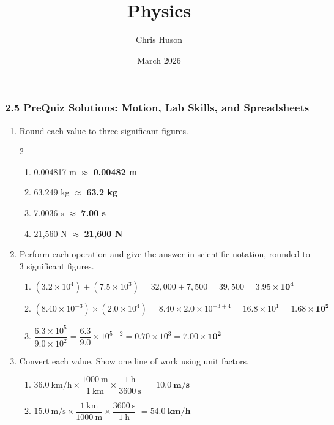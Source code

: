 \documentclass[12pt, twoside]{article}
\title{Physics}
\author{Chris Huson}
\date{March 2026}
\begin{document}
\subsubsection*{2.5 PreQuiz Solutions: Motion, Lab Skills, and Spreadsheets}

\begin{enumerate}[itemsep=0.25cm]

\item Round each value to three significant figures.
  \begin{multicols}{2}
  \begin{enumerate}[itemsep=0.25cm]
    \item 0.004817 m $\approx$ \textbf{0.00482 m}
    \item 63.249 kg $\approx$ \textbf{63.2 kg}
    \item 7.0036 s $\approx$ \textbf{7.00 s}
    \item 21,560 N $\approx$ \textbf{21,600 N}
  \end{enumerate}
  \end{multicols}
  \vspace{0.25cm}

\item Perform each operation and give the answer in scientific notation, rounded to 3 significant figures.
  \begin{enumerate}[itemsep=0.5cm]
    \item $(3.2\times10^{4}) + (7.5\times10^{3}) = 32{,}000 + 7{,}500 = 39{,}500 = \mathbf{3.95\times10^{4}}$
    \item $(8.40\times10^{-3}) \times (2.0\times10^{4}) = 8.40 \times 2.0 \times 10^{-3+4} = 16.8 \times 10^{1} = \mathbf{1.68\times10^{2}}$
    \item $\dfrac{6.3\times10^{5}}{9.0\times10^{2}} = \dfrac{6.3}{9.0}\times10^{5-2} = 0.70\times10^{3} = \mathbf{7.00\times10^{2}}$
  \end{enumerate}
  \vspace{0.25cm}

\item Convert each value. Show one line of work using unit factors.
  \begin{enumerate}[itemsep=0.75cm]
    \item $36.0~\text{km/h} \times \dfrac{1000~\text{m}}{1~\text{km}} \times \dfrac{1~\text{h}}{3600~\text{s}}$ $= \mathbf{10.0~\textbf{m/s}}$
    \item $15.0~\text{m/s} \times \dfrac{1~\text{km}}{1000~\text{m}} \times \dfrac{3600~\text{s}}{1~\text{h}}$ $= \mathbf{54.0~\textbf{km/h}}$
  \end{enumerate}
  \vspace{0.25cm}


\end{enumerate}
\end{document}
